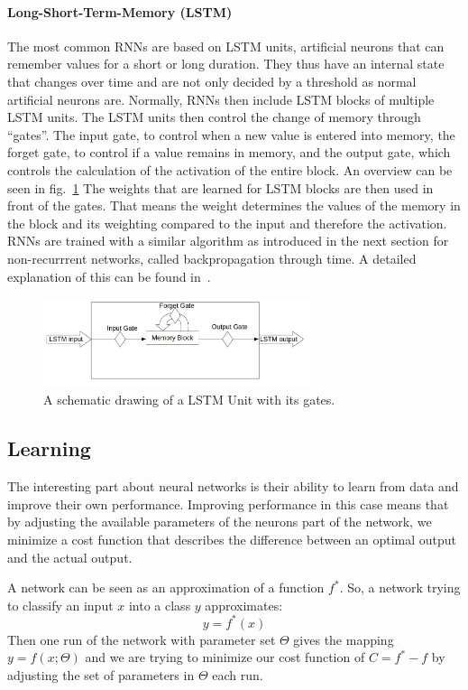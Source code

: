 \paragraph{Long-Short-Term-Memory (LSTM)} The most common RNNs are based on LSTM units, artificial neurons that can remember values for a short or long duration. They thus have an internal state that changes over time and are not only decided by a threshold as normal artificial neurons are. Normally, RNNs then include LSTM blocks of multiple LSTM units. The LSTM units then control the change of memory through ``gates''. The input gate, to control when a new value is entered into memory, the forget gate, to control if a value remains in memory, and the output gate, which controls the calculation of the activation of the entire block. An overview can be seen in fig.~\ref{fig:lstm} The weights that are learned for LSTM blocks are then used in front of the gates. That means the weight determines the values of the memory in the block and its weighting compared to the input and therefore the activation. RNNs are trained with a similar algorithm as introduced in the next section for non-recurrrent networks, called backpropagation through time. A detailed explanation of this can be found in~\cite{58337}.


\begin{figure}[!htbp]
\label{fig:lstm}
\caption{A schematic drawing of a LSTM Unit with its gates.}
\centering
\includegraphics[width=0.7\textwidth]{images/lstm.jpg}
\end{figure}

\subsection{Learning}
\label{sec:fund:Learn}
The interesting part about neural networks is their ability to learn from data and improve their own performance. Improving performance in this case means that by adjusting the available parameters of the neurons part of the network, we minimize a cost function that describes the difference between an optimal output and the actual output. 

A network can be seen as an approximation of a function \(f^*\). So, a network trying to classify an input \(x\) into a class \(y\) approximates:
\begin{equation}
\label{eq:learn}
y=f^*(x)
\end{equation}
Then one run of the network with parameter set \(\Theta\) gives the mapping \(y = f(x;\Theta)\) and we are trying to minimize our cost function of \(C= f^* - f\) by adjusting the set of parameters in \(\Theta\) each run.


